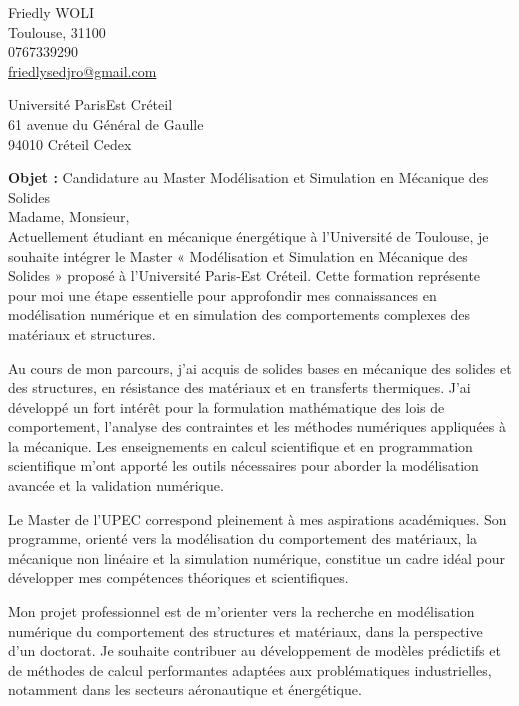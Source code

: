 \documentclass[11pt,a4paper]{article}
\begin{document}
	\pagestyle{empty}
	
	\noindent
	Friedly WOLI \\
	Toulouse, 31100 \\
	0767339290 \\
	\href{mailto:friedlysedjro@gmail.com}{friedlysedjro@gmail.com}
	
	\begin{flushright}
		Université Paris\-Est Créteil  \\
		61 avenue du Général de Gaulle \\
		94010 Créteil Cedex
	\end{flushright}
	
	\bigskip
	
	\textbf{Objet :} Candidature au Master Modélisation et Simulation en Mécanique des Solides \\
	
	Madame, Monsieur,\\
	
	Actuellement étudiant en mécanique énergétique à l’Université de Toulouse, je souhaite intégrer le Master « Modélisation et Simulation en Mécanique des Solides » proposé à l’Université Paris-Est Créteil. Cette formation représente pour moi une étape essentielle pour approfondir mes connaissances en modélisation numérique et en simulation des comportements complexes des matériaux et structures.
	
	Au cours de mon parcours, j’ai acquis de solides bases en mécanique des solides et des structures, en résistance des matériaux et en transferts thermiques. J’ai développé un fort intérêt pour la formulation mathématique des lois de comportement, l’analyse des contraintes et les méthodes numériques appliquées à la mécanique. Les enseignements en calcul scientifique et en programmation scientifique m’ont apporté les outils nécessaires pour aborder la modélisation avancée et la validation numérique.
	
	Le Master de l’UPEC correspond pleinement à mes aspirations académiques. Son programme, orienté vers la modélisation du comportement des matériaux, la mécanique non linéaire et la simulation numérique, constitue un cadre idéal pour développer mes compétences théoriques et scientifiques. 
	
	Mon projet professionnel est de m’orienter vers la recherche en modélisation numérique du comportement des structures et matériaux, dans la perspective d’un doctorat. Je souhaite contribuer au développement de modèles prédictifs et de méthodes de calcul performantes adaptées aux problématiques industrielles, notamment dans les secteurs aéronautique et énergétique.
	
\end{document}
